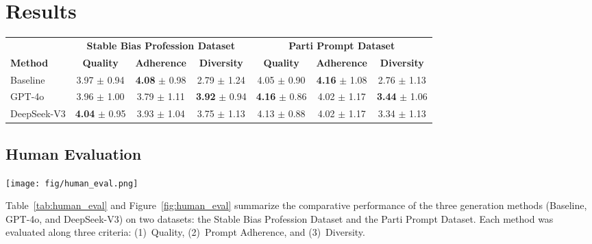 \section{Results}
\label{sec:results}

\begin{table*}[t]
  \centering
  \caption{Human Evaluation Results: Comparison of Generation Methods Across Two Datasets.
           Mean $\pm$ Standard Deviation Reported for Quality, Prompt Adherence, and Diversity Metrics.}
  \label{tab:human_eval}
  \begin{tabular}{l|ccc|ccc}
    \toprule
    & \multicolumn{3}{c}{\textbf{Stable Bias Profession Dataset}} & \multicolumn{3}{c}{\textbf{Parti Prompt Dataset}} \\
    \textbf{Method} & \textbf{Quality} & \textbf{Adherence} & \textbf{Diversity} 
                    & \textbf{Quality} & \textbf{Adherence} & \textbf{Diversity} \\
    \midrule
    Baseline 
    & 3.97 $\pm$ 0.94 & \textbf{4.08} $\pm$ 0.98 & 2.79 $\pm$ 1.24
    & 4.05 $\pm$ 0.90 & \textbf{4.16} $\pm$ 1.08 & 2.76 $\pm$ 1.13 \\
    GPT-4o 
    & 3.96 $\pm$ 1.00 & 3.79 $\pm$ 1.11 & \textbf{3.92} $\pm$ 0.94
    & \textbf{4.16} $\pm$ 0.86 & 4.02 $\pm$ 1.17 & \textbf{3.44} $\pm$ 1.06 \\
    DeepSeek-V3 
    & \textbf{4.04} $\pm$ 0.95 & 3.93 $\pm$ 1.04 & 3.75 $\pm$ 1.13
    & 4.13 $\pm$ 0.88 & 4.02 $\pm$ 1.17 & 3.34 $\pm$ 1.13 \\
    \bottomrule
  \end{tabular}
\end{table*}

\subsection{Human Evaluation}
\begin{figure*}[htbp]
    \centering
    \texttt{[image: fig/human\_eval.png]}
    \caption{Comparison of human evaluation metrics across the Stable Bias Profession Dataset (left) and Parti Prompt Dataset (right). The distributions of quality, prompt adherence, and diversity are illustrated with respect to frequency and scores for different methods (Baseline, GPT-4o, and DeepSeek-V3). Mean and standard deviation values for each method are provided for comprehensive analysis.}
    \label{fig:human_eval}
\end{figure*}

Table~\ref{tab:human_eval} and Figure~\ref{fig:human_eval} summarize the comparative performance of the three generation methods (Baseline, GPT-4o, and DeepSeek-V3) on two datasets: the Stable Bias Profession Dataset and the Parti Prompt Dataset. Each method was evaluated along three criteria: (1)~Quality, (2)~Prompt Adherence, and (3)~Diversity.


